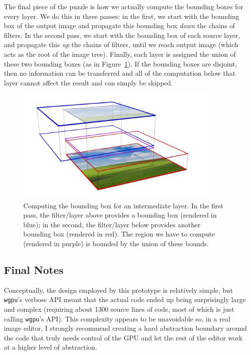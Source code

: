 \documentclass[12pt]{article}
\begin{document}
The final piece of the puzzle is how we actually compute the bounding boxes for every layer.  We do
this in three passes: in the first, we start with the bounding box of the output image and propagate
this bounding box \emph{down} the chains of filters.  In the second pass, we start with the bounding box of
each source layer, and propagate this \emph{up} the chains of filters, until we reach output image
(which acts as the root of the image tree).  Finally, each layer is assigned the union of these two
bounding boxes (as in Figure~\ref{fig:bbox-compute}).  If the bounding boxes are disjoint, then no
information can be transferred and all of the computation below that layer cannot affect the result
and can simply be skipped.

\begin{figure}
    \begin{center}
        \includegraphics[width=0.9\textwidth]{bbox-compute}
    \end{center}
    \caption{Computing the bounding box for an intermediate layer.  In the first pass, the
    filter/layer above provides a bounding box (rendered in {\color{blue} blue}); in the second, the
    filter/layer below provides another bounding box (rendered in {\color{red} red}).  The region we
    have to compute (rendered in {\color{violet} purple}) is bounded by the union of these
    bounds.}\label{fig:bbox-compute}
\end{figure}

\subsection{Final Notes}

Conceptually, the design employed by this prototype is relatively simple, but \verb|wgpu|'s verbose
API meant that the actual code ended up being surprisingly large and complex (requiring about 1300
source lines of code, most of which is just calling \verb|wgpu|'s API).  This complexity appears to
be unavoidable so, in a real image editor, I strongly recommend creating a hard abstraction boundary
around the code that truly needs control of the GPU and let the rest of the editor work at a higher
level of abstraction.
\end{document}
